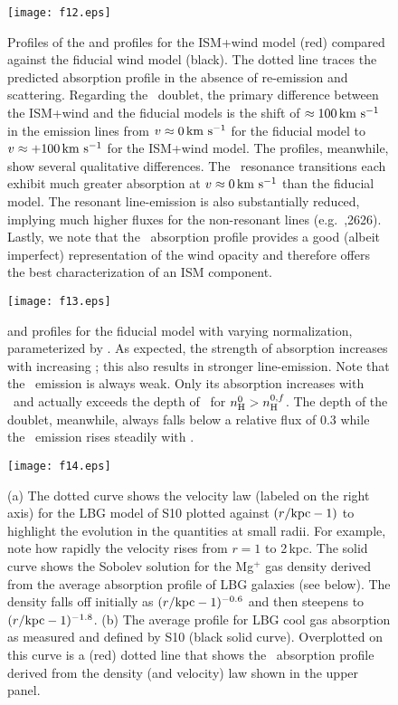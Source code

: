 \documentclass[12pt,preprint]{aastex}
\begin{document}
\begin{figure}
\texttt{[image: f12.eps]}
\caption{
Profiles of the  and  profiles for the ISM+wind
model (red) compared against the fiducial wind model (black). 
The dotted line traces the predicted absorption profile in the absence
of re-emission and scattering.
Regarding the ~doublet, the primary difference between the
ISM+wind and the fiducial models is the shift of $\approx 100 \, {\rm km~s^{-1}}$
in the emission lines from $v \approx 0 \, {\rm km~s^{-1}}$ for the fiducial
model to $v \approx +100\, {\rm km~s^{-1}}$ for the ISM+wind model. 
The  profiles, meanwhile, show several qualitative differences. 
The \feiid\ resonance transitions each exhibit much
greater absorption at $v \approx 0 \, {\rm km~s^{-1}}$ than the fiducial model.
The resonant line-emission is also substantially
reduced, implying much higher fluxes for the non-resonant lines (e.g.\
\feiic,2626).  
Lastly, we note that the \feiia\ absorption profile provides a good
(albeit imperfect) representation of the wind opacity and therefore
offers the best characterization of an ISM component.
}
\label{fig:ISM_spec}
\end{figure}

\begin{figure}
\texttt{[image: f13.eps]}
\caption{
 and  profiles for the fiducial model with
varying normalization, parameterized by \nhn.  As expected, the
strength of absorption increases with increasing \nhn; this also
results in stronger line-emission.  Note that the \feiia\ emission is
always weak. Only its absorption increases with \nhn\ and actually exceeds
the depth of \feiib\ for $n_{\rm H}^0 > n_{\rm H}^{0,f}$.  The depth of the
 doublet, meanwhile, always falls below a relative flux of
0.3 while the \mgiib\ emission rises steadily with \nhn.
}
\label{fig:norm}
\end{figure}

\begin{figure}
\texttt{[image: f14.eps]}
\caption{
(a) The dotted curve shows the velocity law (labeled on the
right axis) for the LBG model
of S10 plotted against $(r/{\rm kpc} -1)$ to highlight the evolution
in the quantities at small radii.  For example,  note how rapidly the velocity rises from $r =
1$ to 2\,kpc.  The solid curve shows the Sobolev solution for the
Mg$^+$ gas
density derived from 
the average absorption profile of LBG galaxies (see below).
The density falls off initially as $(r/{\rm kpc}-1)^{-0.6}$ and then
steepens to $(r/{\rm kpc}-1)^{-1.8}$.
(b) The average profile for LBG cool gas absorption as
measured and defined by S10
(black solid curve).  Overplotted on this curve is a (red) dotted line that
shows the \mgiia\ absorption profile derived from the density (and velocity)
law shown in the upper panel.  
}
\label{fig:LBG_Sobolev}
\end{figure}
\end{document}
